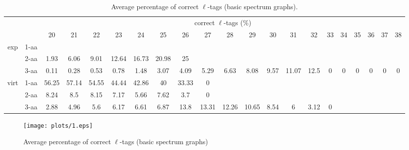 \documentclass{article}
\begin{document}
\begin{landscape}
\begin{table}[h]\tiny
\vspace{3mm}
{\centering
\begin{center}
\begin{tabular}{|c|l|c|c|c|c|c|c|c|c|c|c|c|c|c|c|c|c|c|c|c|}
  \hline
  \multicolumn{2}{|c|}{ } & \multicolumn{ 19 }{|c|}{ correct $\ell$-tags (\%)} \\
  \cline{3- 21}
  \multicolumn{2}{|c|}{ }  & 20 & 21 & 22 & 23 & 24 & 25 & 26 & 27 & 28 & 29 & 30 & 31 & 32 & 33 & 34 & 35 & 36 & 37 & 38\\
  \hline
  \multirow{3}{*}{exp}
&  1-aa  &  &  &  &  &  &  &  &  &  &  &  &  &  &  &  &  &  &  & \\
&  2-aa  & 1.93 & 6.06 & 9.01 & 12.64 & 16.73 & 20.98 & 25 &  &  &  &  &  &  &  &  &  &  &  & \\
&  3-aa  & 0.11 & 0.28 & 0.53 & 0.78 & 1.48 & 3.07 & 4.09 & 5.29 & 6.63 & 8.08 & 9.57 & 11.07 & 12.5 & 0 & 0 & 0 & 0 & 0 & 0\\
 \hline
  \multirow{3}{*}{virt} 
&  1-aa  & 56.25 & 57.14 & 54.55 & 44.44 & 42.86 & 40 & 33.33 & 0 &  &  &  &  &  &  &  &  &  &  & \\
&  2-aa  & 8.24 & 8.5 & 8.15 & 7.17 & 5.66 & 7.62 & 3.7 & 0 &  &  &  &  &  &  &  &  &  &  & \\
&  3-aa  & 2.88 & 4.96 & 5.6 & 6.17 & 6.61 & 6.87 & 13.8 & 13.31 & 12.26 & 10.65 & 8.54 & 6 & 3.12 & 0 &  &  &  &  & \\
 \hline
\end{tabular}
\end{center}
\par}
\centering
\caption{ Average percentage of correct $\ell$-tags (basic spectrum graphs).}
\label{table:table1}
\vspace{3mm}
\end{table}

\end{landscape}

\begin{figure}
  \begin{center}
\texttt{[image: plots/1.eps]}

\end{center}
\caption{Average percentage of correct $\ell$-tags (basic spectrum graphs)}
  \label{fig:LABEL}
\end{figure}
\end{document}
